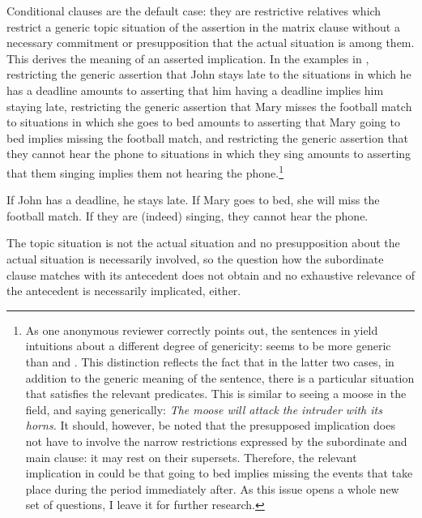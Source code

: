 \documentclass[output=paper]{langscibook}
\begin{document}
Conditional clauses are the default case: they are restrictive relatives which restrict a generic topic situation of the assertion in the matrix clause without a necessary commitment or presupposition that the actual situation is among them. This derives the meaning of an asserted implication. In the examples in , restricting the generic assertion that John stays late to the situations in which he has a deadline amounts to asserting that him having a deadline implies him staying late, restricting the generic assertion that Mary misses the football match to situations in which she goes to bed amounts to asserting that Mary going to bed implies missing the football match, and restricting the generic assertion that they cannot hear the phone to situations in which they sing amounts to asserting that them singing implies them not hearing the phone.\footnote{As one anonymous reviewer correctly points out, the sentences in  yield intuitions about a different degree of genericity:  seems to be more generic than  and . This distinction reflects the fact that in the latter two cases, in addition to the generic meaning of the sentence, there is a particular situation that satisfies the relevant predicates. This is similar to seeing a moose in the field, and saying generically: \textit{The moose will attack the intruder with its horns.} It should, however, be noted that the presupposed implication does not have to involve the narrow restrictions expressed by the subordinate and main clause: it may rest on their supersets. Therefore, the relevant implication in  could be that going to bed implies missing the events that take place during the period immediately after. As this issue opens a whole new set of questions, I leave it for further research.}

\ea\label{ex:Cond2}
\ea If John has a deadline, he stays late.\label{ex:Cond2-a}
\ex If Mary goes to bed, she will miss the football match.\label{ex:Cond2-b}
\ex If they are (indeed) singing, they cannot hear the phone.\label{ex:Cond2-c}
\z\z

\noindent The topic situation is not the actual situation and no presupposition about the actual situation is necessarily involved, so the question how the subordinate clause matches with its antecedent does not obtain and no exhaustive relevance of the antecedent is necessarily implicated, either.

\end{document}
